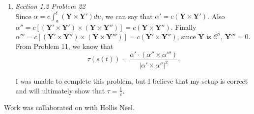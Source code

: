 \documentclass{article}
\begin{document}
\begin{enumerate}
\begin{enumerate}
\end{enumerate}
\clearpage
\item \textit{Section 1.2 Problem 22}\\
\newline
Since $\alpha = c\displaystyle\int_a^t(\mathbf{Y}\times\mathbf{Y'})du$, we can say that $\alpha' = c(\mathbf{Y}\times\mathbf{Y'})$.
Also $\alpha'' = c[(\mathbf{Y'}\times\mathbf{Y'})\times(\mathbf{Y}\times\mathbf{Y''})] = c(\mathbf{Y}\times\mathbf{Y''})$.
Finally $\alpha''' = c[(\mathbf{Y'}\times\mathbf{Y''})\times(\mathbf{Y}\times\mathbf{Y'''})] = c(\mathbf{Y'}\times\mathbf{Y''})$, since $\mathbf{Y}$ is $\mathcal{C}^2$, $\mathbf{Y'''} = 0$.
From Problem 11, we know that 
\begin{equation*}
\tau(s(t)) = \frac{\alpha' \cdot (\alpha'' \times \alpha''')}{|\alpha' \times \alpha''|^2}.
\end{equation*}

I was unable to complete this problem, but I believe that my setup is correct and will ultimately show that $\tau = \frac{1}{c}$.

\end{enumerate}

Work was collaborated on with Hollis Neel.
\end{document}
